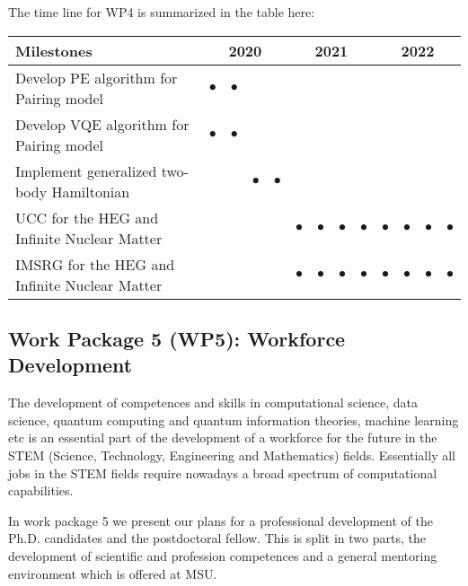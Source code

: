\documentclass[10pt]{article}
\begin{document}
The time line for WP4 is summarized in the table here:
\begin{footnotesize}
\begin{center}
\begin{tabular}{|l|c|c|c|c|c|c|c|c|c|c|c|c|}
\hline
\multicolumn{1}{|l}{Milestones } & \multicolumn{4}{|c|}{ 2020 } & \multicolumn{4}{c|}{ 2021 } & \multicolumn{4}{c|}{ 2022 } \\
\hline
Develop PE algorithm for Pairing model &$\bullet$ &$\bullet$ && & & & & & & & &  \\
\hline
Develop VQE algorithm for Pairing model &$\bullet$  & $\bullet$ & & &  & & & & & &  \\
\hline
Implement generalized two-body Hamiltonian & & &$\bullet$  & $\bullet$ & & & & & & & &  \\

\hline
UCC for the HEG and Infinite Nuclear Matter & && & &$\bullet$  &$\bullet$ &$\bullet$  &$\bullet$  &$\bullet$  &$\bullet$ &$\bullet$  &$\bullet$   \\
\hline
IMSRG for the HEG and Infinite Nuclear Matter & && & &$\bullet$  &$\bullet$ &$\bullet$  &$\bullet$  &$\bullet$  &$\bullet$ &$\bullet$  &$\bullet$   \\
\hline

\end{tabular}
\end{center}
\end{footnotesize}

\subsection{Work Package 5 (WP5): Workforce Development}

The development of competences and skills in computational science, data science, quantum computing and quantum information theories, machine learning etc is an essential part of the development of a workforce for the future in the STEM (Science, Technology, Engineering and Mathematics) fields. Essentially all jobs in the STEM fields require nowadays a broad spectrum of computational capabilities. 

In work package 5 we present our plans for a professional development of the Ph.D. candidates and the postdoctoral fellow. This is split in two parts, the development of scientific and profession competences and a general mentoring environment which is offered at MSU. 
\end{document}
